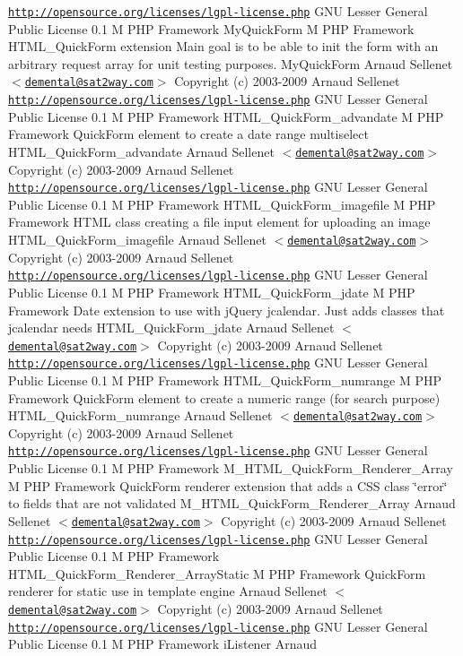 \begin{Desc}
\href{http://opensource.org/licenses/lgpl-license.php}{\tt http://opensource.org/licenses/lgpl-license.php} GNU Lesser General Public License  0.1  M PHP Framework   MyQuickForm  M PHP Framework  HTML\_\-QuickForm extension Main goal is to be able to init the form with an arbitrary request array for unit testing purposes.   MyQuickForm  Arnaud Sellenet $<$\href{mailto:demental@sat2way.com}{\tt demental@sat2way.com}$>$  Copyright (c) 2003-2009 Arnaud Sellenet  \href{http://opensource.org/licenses/lgpl-license.php}{\tt http://opensource.org/licenses/lgpl-license.php} GNU Lesser General Public License  0.1  M PHP Framework   HTML\_\-QuickForm\_\-advandate  M PHP Framework  QuickForm element to create a date range multiselect   HTML\_\-QuickForm\_\-advandate  Arnaud Sellenet $<$\href{mailto:demental@sat2way.com}{\tt demental@sat2way.com}$>$  Copyright (c) 2003-2009 Arnaud Sellenet  \href{http://opensource.org/licenses/lgpl-license.php}{\tt http://opensource.org/licenses/lgpl-license.php} GNU Lesser General Public License  0.1  M PHP Framework   HTML\_\-QuickForm\_\-imagefile  M PHP Framework  HTML class creating a file input element for uploading an image   HTML\_\-QuickForm\_\-imagefile  Arnaud Sellenet $<$\href{mailto:demental@sat2way.com}{\tt demental@sat2way.com}$>$  Copyright (c) 2003-2009 Arnaud Sellenet  \href{http://opensource.org/licenses/lgpl-license.php}{\tt http://opensource.org/licenses/lgpl-license.php} GNU Lesser General Public License  0.1  M PHP Framework   HTML\_\-QuickForm\_\-jdate  M PHP Framework  Date extension to use with jQuery jcalendar. Just adds classes that jcalendar needs   HTML\_\-QuickForm\_\-jdate  Arnaud Sellenet $<$\href{mailto:demental@sat2way.com}{\tt demental@sat2way.com}$>$  Copyright (c) 2003-2009 Arnaud Sellenet  \href{http://opensource.org/licenses/lgpl-license.php}{\tt http://opensource.org/licenses/lgpl-license.php} GNU Lesser General Public License  0.1  M PHP Framework   HTML\_\-QuickForm\_\-numrange  M PHP Framework  QuickForm element to create a numeric range (for search purpose)   HTML\_\-QuickForm\_\-numrange  Arnaud Sellenet $<$\href{mailto:demental@sat2way.com}{\tt demental@sat2way.com}$>$  Copyright (c) 2003-2009 Arnaud Sellenet  \href{http://opensource.org/licenses/lgpl-license.php}{\tt http://opensource.org/licenses/lgpl-license.php} GNU Lesser General Public License  0.1  M PHP Framework   M\_\-HTML\_\-QuickForm\_\-Renderer\_\-Array  M PHP Framework  QuickForm renderer extension that adds a CSS class \char`\"{}error\char`\"{} to fields that are not validated   M\_\-HTML\_\-QuickForm\_\-Renderer\_\-Array  Arnaud Sellenet $<$\href{mailto:demental@sat2way.com}{\tt demental@sat2way.com}$>$  Copyright (c) 2003-2009 Arnaud Sellenet  \href{http://opensource.org/licenses/lgpl-license.php}{\tt http://opensource.org/licenses/lgpl-license.php} GNU Lesser General Public License  0.1  M PHP Framework   HTML\_\-QuickForm\_\-Renderer\_\-ArrayStatic  M PHP Framework  QuickForm renderer for static use in template engine    Arnaud Sellenet $<$\href{mailto:demental@sat2way.com}{\tt demental@sat2way.com}$>$  Copyright (c) 2003-2009 Arnaud Sellenet  \href{http://opensource.org/licenses/lgpl-license.php}{\tt http://opensource.org/licenses/lgpl-license.php} GNU Lesser General Public License  0.1  M PHP Framework   iListener  Arnaud 
\end{Desc}
